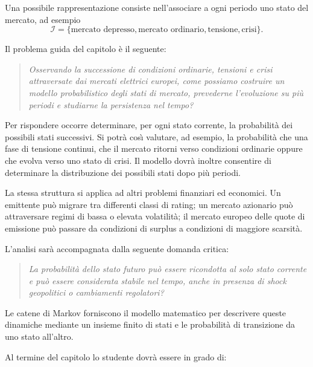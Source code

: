 Una possibile rappresentazione consiste nell'associare a ogni periodo
uno stato del mercato, ad esempio
\[
\mathcal{I}
=
\{
\text{mercato depresso},
\text{mercato ordinario},
\text{tensione},
\text{crisi}
\}.
\]

Il problema guida del capitolo \`{e} il seguente:

\begin{quote}
\emph{Osservando la successione di condizioni ordinarie, tensioni e
crisi attraversate dai mercati elettrici europei, come possiamo
costruire un modello probabilistico degli stati di mercato, prevederne
l'evoluzione su pi\`{u} periodi e studiarne la persistenza nel tempo?}
\end{quote}

Per rispondere occorre determinare, per ogni stato corrente, la
probabilit\`{a} dei possibili stati successivi. Si potr\`{a} cos\`{\i}
valutare, ad esempio, la probabilit\`{a} che una fase di tensione
continui, che il mercato ritorni verso condizioni ordinarie oppure che
evolva verso uno stato di crisi. Il modello dovr\`{a} inoltre consentire
di determinare la distribuzione dei possibili stati dopo pi\`{u}
periodi.

La stessa struttura si applica ad altri problemi finanziari ed
economici. Un emittente pu\`{o} migrare tra differenti classi di rating;
un mercato azionario pu\`{o} attraversare regimi di bassa o elevata
volatilit\`{a}; il mercato europeo delle quote di emissione pu\`{o}
passare da condizioni di surplus a condizioni di maggiore scarsit\`{a}.

L'analisi sar\`{a} accompagnata dalla seguente domanda critica:

\begin{quote}
\emph{La probabilit\`{a} dello stato futuro pu\`{o} essere ricondotta
al solo stato corrente e pu\`{o} essere considerata stabile nel tempo,
anche in presenza di shock geopolitici o cambiamenti regolatori?}
\end{quote}

Le catene di Markov forniscono il modello matematico per descrivere
queste dinamiche mediante un insieme finito di stati e le probabilit\`{a}
di transizione da uno stato all'altro.

Al termine del capitolo lo studente dovr\`{a} essere in grado di:

